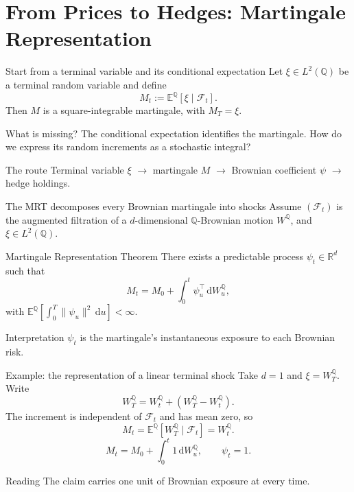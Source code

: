 \documentclass[handout,10pt,aspectratio=169]{beamer}
\newcommand{\dd}{\,\mathrm d}
\newcommand{\E}{\mathbb E}
\newcommand{\Q}{\mathbb Q}
\newcommand{\R}{\mathbb R}
\newcommand{\cF}{\mathcal F}
\newcommand{\1}{\mathbf 1}
\begin{document}
\section{From Prices to Hedges: Martingale Representation}

\begin{frame}{Start from a terminal variable and its conditional expectation}
Let \(\xi\in L^2(\Q)\) be a terminal random variable and define
\[
\boxed{M_t:=\E^\Q[\xi\mid\cF_t].}
\]
Then \(M\) is a square-integrable martingale, with \(M_T=\xi\).
\begin{block}{What is missing?}
The conditional expectation identifies the martingale. How do we express
its random increments as a stochastic integral?
\end{block}
\begin{exampleblock}{The route}
Terminal variable \(\xi\) \(\longrightarrow\) martingale \(M\)
\(\longrightarrow\) Brownian coefficient \(\psi\)
\(\longrightarrow\) hedge holdings.
\end{exampleblock}
\end{frame}

\begin{frame}{The MRT decomposes every Brownian martingale into shocks}
Assume \((\cF_t)\) is the augmented filtration of a \(d\)-dimensional
\(\Q\)-Brownian motion \(W^\Q\), and \(\xi\in L^2(\Q)\).
\begin{block}{Martingale Representation Theorem}
There exists a predictable process \(\psi_t\in\R^d\) such that
\[
\boxed{
M_t=M_0+\int_0^t\psi_u^\top\dd W_u^\Q,}
\]
with \(\E^\Q[\int_0^T\|\psi_u\|^2\dd u]<\infty\).
\end{block}
\begin{exampleblock}{Interpretation}
\(\psi_t\) is the martingale's instantaneous exposure to each Brownian risk.
\end{exampleblock}
\end{frame}

\begin{frame}{Example: the representation of a linear terminal shock}
Take \(d=1\) and \(\xi=W_T^\Q\). Write
\[
W_T^\Q=W_t^\Q+(W_T^\Q-W_t^\Q).
\]
The increment is independent of \(\cF_t\) and has mean zero, so
\[
M_t=\E^\Q[W_T^\Q\mid\cF_t]=W_t^\Q.
\]
\[
\boxed{M_t=M_0+\int_0^t1\dd W_u^\Q,}
\qquad
\boxed{\psi_t=1.}
\]
\begin{block}{Reading}
The claim carries one unit of Brownian exposure at every time.
\end{block}
\end{frame}
\end{document}
